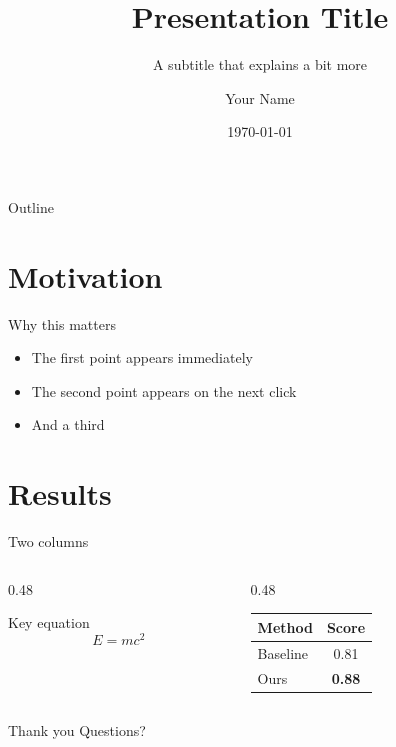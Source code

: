 \documentclass[aspectratio=169]{beamer}
\title[Short title]{Presentation Title}
\subtitle{A subtitle that explains a bit more}
\author{Your Name}
\institute{Your Institution}
\date{\today}
\begin{document}
\begin{frame}
  \titlepage
\end{frame}

\begin{frame}{Outline}
  \tableofcontents
\end{frame}

\section{Motivation}
\begin{frame}{Why this matters}
  \begin{itemize}
    \item<1-> The first point appears immediately
    \item<2-> The second point appears on the next click
    \item<3-> And a third
  \end{itemize}
\end{frame}

\section{Results}
\begin{frame}{Two columns}
  \begin{columns}[T]
    \begin{column}{0.48\textwidth}
      \begin{block}{Key equation}
        \[ E = mc^2 \]
      \end{block}
    \end{column}
    \begin{column}{0.48\textwidth}
      \centering
      \begin{tabular}{@{}lc@{}}
        \toprule
        Method & Score \\
        \midrule
        Baseline & 0.81 \\
        Ours     & \textbf{0.88} \\
        \bottomrule
      \end{tabular}
    \end{column}
  \end{columns}
\end{frame}

\begin{frame}{Thank you}
  \centering
  \Large Questions?
\end{frame}
\end{document}
